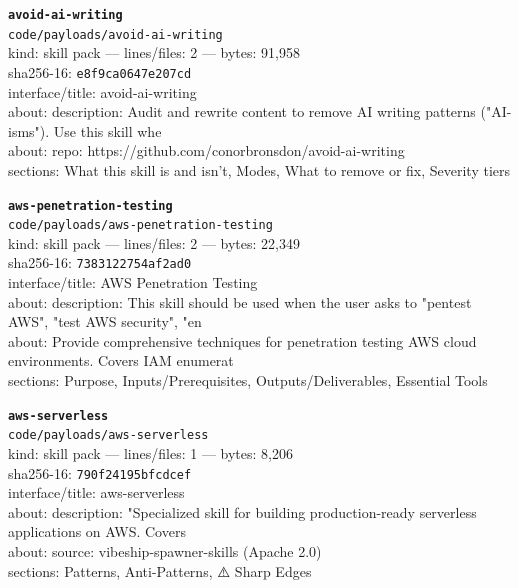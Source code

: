 \noindent\textbf{\texttt{avoid-ai-writing}}\\
\texttt{code/payloads/avoid-ai-writing}\\
kind: skill pack --- lines/files: 2 --- bytes: 91,958\\
sha256-16: \texttt{e8f9ca0647e207cd}\\
interface/title: avoid-ai-writing\\
about: description: Audit and rewrite content to remove AI writing patterns ("AI-isms"). Use this skill whe\\
about: repo: https://github.com/conorbronsdon/avoid-ai-writing\\
sections: What this skill is and isn't, Modes, What to remove or fix, Severity tiers\\
\vspace*{6.0pt}

\noindent\textbf{\texttt{aws-penetration-testing}}\\
\texttt{code/payloads/aws-penetration-testing}\\
kind: skill pack --- lines/files: 2 --- bytes: 22,349\\
sha256-16: \texttt{7383122754af2ad0}\\
interface/title: AWS Penetration Testing\\
about: description: This skill should be used when the user asks to "pentest AWS", "test AWS security", "en\\
about: Provide comprehensive techniques for penetration testing AWS cloud environments. Covers IAM enumerat\\
sections: Purpose, Inputs/Prerequisites, Outputs/Deliverables, Essential Tools\\
\vspace*{6.0pt}

\noindent\textbf{\texttt{aws-serverless}}\\
\texttt{code/payloads/aws-serverless}\\
kind: skill pack --- lines/files: 1 --- bytes: 8,206\\
sha256-16: \texttt{790f24195bfcdcef}\\
interface/title: aws-serverless\\
about: description: "Specialized skill for building production-ready serverless applications on AWS. Covers\\
about: source: vibeship-spawner-skills (Apache 2.0)\\
sections: Patterns, Anti-Patterns, ⚠️ Sharp Edges\\
\vspace*{6.0pt}
\newpage

